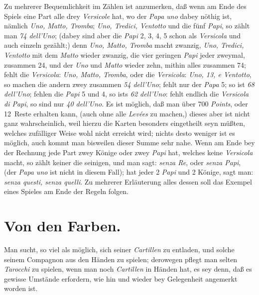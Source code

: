 \documentclass[11pt,a6paper,twoside]{article}
\begin{document}
Zu mehrerer Bequemlichkeit im Zählen ist anzumerken, daß wenn am Ende des Spiels eine Part alle drey \textit{Versicole} hat, wo der \textit{Papa uno} dabey nöthig ist, nämlich \textit{Uno, Matto, Tromba}; \textit{Uno, Tredici, Ventotto} und die fünf \textit{Papi}, so zählt man \textit{74 dell'Uno}; (dabey sind aber die \textit{Papi} 2, 3, 4, 5 schon als \textit{Versicola} und auch einzeln gezählt;) denn \textit{Uno, Matto, Tromba} macht zwanzig, \textit{Uno, Tredici, Ventotto} mit dem \textit{Matto} wieder zwanzig, die vier geringen \textit{Papi} jeder zweymal, zusammen 24, und der \textit{Uno} und \textit{Matto} wieder zehn, mithin alles zusammen 74; fehlt die \textit{Versicola}: \textit{Uno, Matto, Tromba}, oder die \textit{Versicola}: \textit{Uno, 13, e Ventotto}, so machen die andern zwey zusammen \textit{54 dell'Uno}; fehlt nur der \textit{Papa} 5; so ist \textit{68 dell'Uno}; fehlen die \textit{Papi} 5 und 4, so ists \textit{62 dell'Uno}: fehlt endlich die \textit{Versicola di Papi}, so sind nur \textit{40 dell'Uno}. Es ist möglich, daß man über 700 \textit{Points}, oder 12~Reste erhalten kann, (auch ohne alle \textit{Levées} zu machen,) dieses aber ist nicht ganz wahrscheinlich, weil hierzu die Karten besonders eingetheilt seyn müßten, welches zufälliger Weise wohl nicht erreicht wird; nichts desto weniger ist es möglich, auch kommt man bisweilen dieser Summe sehr nahe. Wenn am Ende bey der Rechnung jede Part zwey Könige oder zwey \textit{Papi} hat, welches keine \textit{Versicola} macht, so zählt keiner die seinigen, und man sagt: \textit{senza Re}, oder \textit{senza Papi}, (der \textit{Papa uno} ist nicht in diesem Fall); hat jeder 2 \textit{Papi} und 2 Könige, sagt man: \textit{senza questi, senza quelli}. Zu mehrerer Erläuterung alles dessen soll das Exempel eines Spieles am Ende der Regeln folgen.


\section{Von den Farben.}

Man sucht, so viel als möglich, sich seiner \textit{Cartillen} zu entladen, und solche seinem Compagnon aus den Händen zu spielen; derowegen pflegt man selten \textit{Tarocchi} zu spielen, wenn man noch \textit{Cartillen} in Händen hat, es sey denn, daß es gewisse Umstände erfordern, wie hin und wieder bey Gelegenheit angemerkt worden ist.
\end{document}
